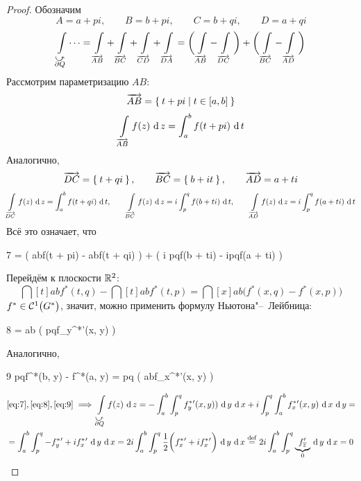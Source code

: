 \begin{proof}
	Обозначим
	$$ A = a + pi, \qquad B = b + pi, \qquad C = b + qi, \qquad D = a + qi $$
	$$ \int\limits_{\curvedir{\partial Q}}\dots = \int\limits_{\overrightarrow{AB}} + \int\limits_{\overrightarrow{BC}} + \int\limits_{\overrightarrow{CD}} + \int\limits_{\overrightarrow{DA}} = \bigg( \int\limits_{\overrightarrow{AB}} - \int\limits_{\overrightarrow{DC}} \bigg) + \bigg( \int\limits_{\overrightarrow{BC}} - \int\limits_{\overrightarrow{AD}} \bigg) $$
	Рассмотрим параметризацию $ AB $:
	$$ \overrightarrow{AB} = \set{t + pi \mid t \in [a, b]} $$
	$$ \cint[z]{\overrightarrow{AB}}{f(z)} = \dint[t]ab{f(t + pi)} $$
	Аналогично,
	$$ \overrightarrow{DC} = \set{t + qi}, \qquad \overrightarrow{BC} = \set{b + it}, \qquad \overrightarrow{AD} = {a + ti} $$
	$$ \cint[z]{\overrightarrow{DC}}{f(z)} = \dint[t]ab{f(t + qi)}, \qquad \cint[z]{\overrightarrow{BC}}{f(z)} = i\dint[t]pq{f(b + ti)}, \qquad \cint[z]{\overrightarrow{AD}}{f(z)} = i\dint[t]pq{f(a + ti)} $$
	Всё это означает, что
	\begin{equ}7
		 = \bigg( \dint[t]ab{f(t + pi)} - \dint[t]ab{f(t + qi)} \bigg) + \bigg( i \dint[t]pq{f(b + ti)} - i\dint[t]pq{f(a + ti)} \bigg)
	\end{equ}
	Перейдём к плоскости $ \R^2 $:
	$$ \dint[t]ab{f^*(t, q)} - \dint[t]ab{f^*(t, p)} = \dint[x]ab{ \bigg( f^*(x, q) - f^*(x, p) \bigg) } $$
	$ f^* \in \Cont[1]{G^*} $, значит, можно применить формулу Ньютона"--~Лейбница:
	\begin{equ}8
		= \dint ab{ \bigg( \dint[y]pq{f_y^*{}'(x, y)} \bigg)}
	\end{equ}
	Аналогично,
	\begin{equ}9
		\dint[y]pq{f^*(b, y) - f^*(a, y)} = \dint[y]pq{ \bigg( \dint ab{f_x^*{}'(x, y)} \bigg) }
	\end{equ}
	\begin{multline*}
		\eref7, \eref8, \eref9 \implies \cint[z]{\curvedir{\partial Q}}{f(z)} = -\dint ab{ \dint[y]pq{ f_y^*{}'(x, y))}} + i \dint[y]pq{ \dint ab{f_x^*{}'(x, y)}} = \\
		= \dint ab{ \dint[y]pq{ -f_y^*{}' + if_x^*{}'}} = 2i \dint ab{ \dint[y]pq {\frac12 \bigg( f_x^*{}' + if_x^*{}' \bigg)}} \bydef 2i \dint ab { \dint[y]pq{ \underbrace{f_{\ol z}'}_0}} = 0
	\end{multline*}
\end{proof}

